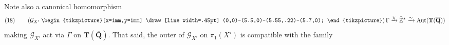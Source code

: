 Note also a canonical homomorphism
\[
(18)\qquad
\left(\mathcal G_{X'}
\mathrel{\vcenter{\hbox{\begin{tikzpicture}[x=1mm,y=1mm]
\draw[line width=.45pt] (0,0)--(5.5,0)--(5.55,.22)--(5.7,0);
\end{tikzpicture}}}}\right)
\Gamma\xrightarrow{\chi}\widehat{\mathbb Z}^{*}
\xrightarrow{\sim}\operatorname{Aut}(\mathbf T(\overline{\mathbf Q}))
\]
making $\mathcal G_{X'}$ act via $\Gamma$ on $\mathbf T(\overline{\mathbf Q})$.
That said, the outer  of $\mathcal G_{X'}$
on $\pi_1(X')$ is compatible with the family
